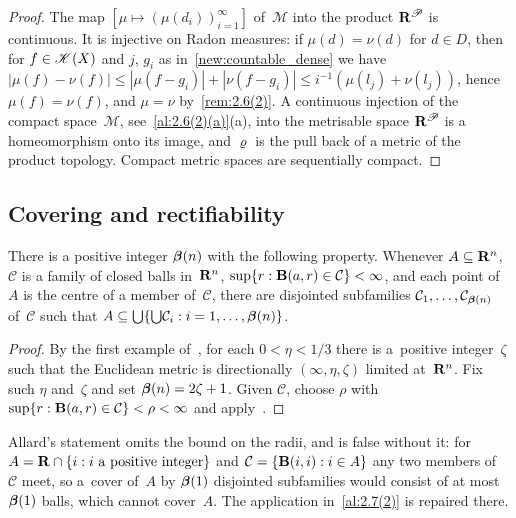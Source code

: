 \begin{proof}
    The map $[\mu \mapsto (\mu(d_i))_{i=1}^\infty]$ of~$\mathcal{M}$ into the product
    $\mathbf{R}^{\mathscr{P}}$ is continuous. It is injective on Radon measures: if $\mu(d) = \nu(d)$ for $d
    \in D$, then for $f \in \mathscr{K}(X)$ and $j$, $g_i$ as in~\ref{new:countable_dense} we have
    $|\mu(f) - \nu(f)| \le |\mu(f - g_i)| + |\nu(f - g_i)| \le i^{-1} (\mu(l_j) + \nu(l_j))$,
    hence $\mu(f) = \nu(f)$, and $\mu = \nu$ by~\ref{rem:2.6(2)}. A continuous injection of the
    compact space~$\mathcal{M}$, see~\ref{al:2.6(2)(a)}(a), into the metrisable space
    $\mathbf{R}^{\mathscr{P}}$ is a homeomorphism onto its image, and $\varrho$ is the pull back of a metric
    of the product topology. Compact metric spaces are sequentially compact.
\end{proof}

\subsection{Covering and rectifiability}

\begin{theorem}
    \label{al:2.7(1)}
    There is a positive integer $\boldsymbol{\beta}(n)$ with the following property. Whenever $A
    \subseteq \mathbf{R}^{n}$, $\mathcal{C}$ is a family of closed balls in~$\mathbf{R}^{n}$, $\sup \{ r :
    \mathbf{B}(a,r) \in \mathcal{C} \} < \infty$, and each point of~$A$ is the centre of a member
    of~$\mathcal{C}$, there are disjointed subfamilies $\mathcal{C}_1, \ldots,
    \mathcal{C}_{\boldsymbol{\beta}(n)}$ of~$\mathcal{C}$ such that $A \subseteq {{\textstyle \bigcup}} \{
    {{\textstyle \bigcup}} \mathcal{C}_i : i = 1, \ldots, \boldsymbol{\beta}(n) \}$.
\end{theorem}

\begin{proof}
    By the first example of~\cite[2.8.9]{Federer1969}, for each $0 < \eta < 1/3$ there is
    a~positive integer~$\zeta$ such that the Euclidean metric is directionally $(\infty, \eta,
    \zeta)$ limited at~$\mathbf{R}^{n}$. Fix such $\eta$ and~$\zeta$ and set $\boldsymbol{\beta}(n) = 2
    \zeta + 1$. Given $\mathcal{C}$, choose $\rho$ with $\sup \{ r : \mathbf{B}(a,r) \in \mathcal{C} \}
    < \rho < \infty$ and apply~\cite[2.8.14]{Federer1969}.
\end{proof}

\begin{remark}
    \label{rem:2.7(1)}
    Allard's statement omits the bound on the radii, and is false without it: for $A = \mathbf{R}
    \cap \{ i : i \text{ a positive integer} \}$ and $\mathcal{C} = \{ \mathbf{B}(i,i) : i \in A \}$ any
    two members of~$\mathcal{C}$ meet, so a~cover of~$A$ by $\boldsymbol{\beta}(1)$ disjointed
    subfamilies would consist of at most $\boldsymbol{\beta}(1)$ balls, which cannot cover~$A$. The
    application in~\ref{al:2.7(2)} is repaired there.
\end{remark}

